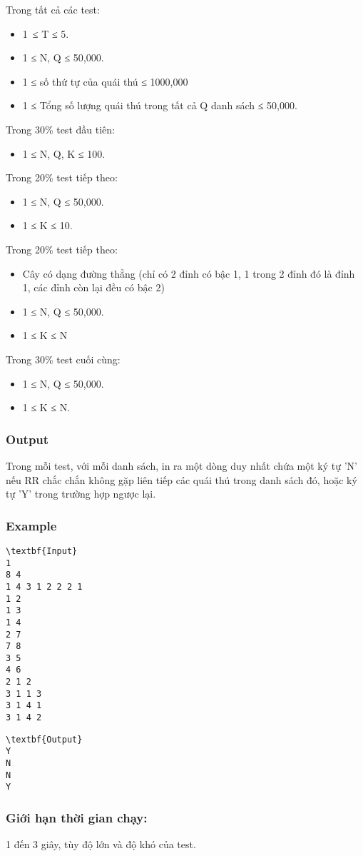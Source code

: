 Trong tất cả các test:
\begin{itemize}
	\item 1 ≤ T ≤ 5.
	\item 1 ≤ N, Q ≤ 50,000.
	\item 1 ≤ số thứ tự của quái thú ≤ 1000,000
	\item 1 ≤ Tổng số lượng quái thú trong tất cả Q danh sách ≤ 50,000.
\end{itemize}

Trong 30\% test đầu tiên:
\begin{itemize}
	\item 1 ≤ N, Q, K ≤ 100.
\end{itemize}

Trong 20\% test tiếp theo:
\begin{itemize}
	\item 1 ≤ N, Q ≤ 50,000.
	\item 1 ≤ K ≤ 10.
\end{itemize}

Trong 20\% test tiếp theo:
\begin{itemize}
	\item Cây có dạng đường thẳng (chỉ có 2 đỉnh có bậc 1, 1 trong 2 đỉnh đó là đỉnh 1, các đỉnh còn lại đều có bậc 2)
	\item 1 ≤ N, Q ≤ 50,000.
	\item 1 ≤ K ≤ N
\end{itemize}

Trong 30\% test cuối cùng:
\begin{itemize}
	\item 1 ≤ N, Q ≤ 50,000.
	\item 1 ≤ K ≤ N.
\end{itemize}

\subsubsection{Output}

Trong mỗi test, với mỗi danh sách, in ra một dòng duy nhất chứa một ký tự 'N' nếu RR chắc chắn không gặp liên tiếp các quái thú trong danh sách đó, hoặc ký tự 'Y' trong trường hợp ngược lại.

\subsubsection{Example}
\begin{verbatim}
\textbf{Input}
1
8 4
1 4 3 1 2 2 2 1
1 2
1 3
1 4
2 7
7 8
3 5
4 6
2 1 2
3 1 1 3
3 1 4 1
3 1 4 2
\end{verbatim}
\begin{verbatim}
\textbf{Output}
Y
N
N
Y
\end{verbatim}

\subsubsection{Giới hạn thời gian chạy:}

1 đến 3 giây, tùy độ lớn và độ khó của test.
